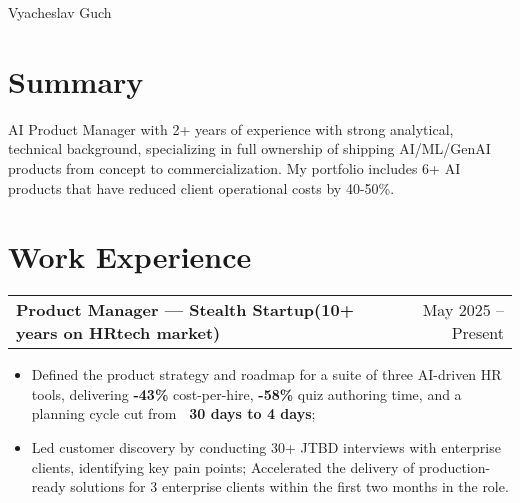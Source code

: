 \documentclass[a4paper,12pt]{article}
\makeatletter
\newenvironment{joblong}[2]
    {
    \begin{tabularx}{\linewidth}{@{}l X r@{}}
    \textbf{#1} & \hfill &  #2 \\[0.25pt]
    \end{tabularx}
    \begin{minipage}[t]{\linewidth}
    \begin{itemize}[leftmargin=1em,label=--]
    }
    {
    \end{itemize}
    \end{minipage}    
    }
\makeatother
\begin{document}
\pagestyle{empty} 



\begin{center}
{\Huge Vyacheslav Guch}\\[2pt]
\noindent{}
\end{center}


\section{Summary}
AI Product Manager with 2+ years of experience with strong analytical, technical background, specializing in full ownership of shipping AI/ML/GenAI products from concept to commercialization. My portfolio includes 6+ AI products that have reduced client operational costs by 40-50\%. 

\section{Work Experience}

\begin{joblong}{Product Manager — Stealth Startup(10+ years on HRtech market)}{May 2025 – Present}
\item Defined the product strategy and roadmap for a suite of three AI-driven HR tools, delivering \textbf{-43\%} cost-per-hire, \textbf{-58\%} quiz authoring time, and a planning cycle cut from \textbf{~30 days to 4 days};
\item Led customer discovery by conducting 30+ JTBD interviews with enterprise clients, identifying key pain points; Accelerated the delivery of production-ready solutions for 3 enterprise clients within the first two months in the role. 
\end{joblong}
\end{document}
